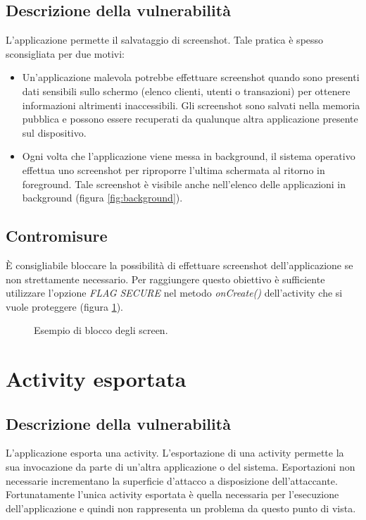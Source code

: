 \subsection{Descrizione della vulnerabilità}
L'applicazione permette il salvataggio di screenshot. Tale pratica è spesso sconsigliata per due motivi:
\begin{itemize}
	\item Un'applicazione malevola potrebbe effettuare screenshot quando sono presenti dati sensibili sullo schermo (elenco clienti, utenti o transazioni) per ottenere informazioni altrimenti inaccessibili. Gli screenshot sono salvati nella memoria pubblica e possono essere recuperati da qualunque altra applicazione presente sul dispositivo.
	\item Ogni volta che l'applicazione viene messa in background, il sistema operativo effettua uno screenshot per riproporre l'ultima schermata al ritorno in foreground. Tale screenshot è visibile anche nell'elenco delle applicazioni in background (figura \ref{fig:background}).
\end{itemize}

\subsection{Contromisure}
È consigliabile bloccare la possibilità di effettuare screenshot dell'applicazione se non strettamente necessario. Per raggiungere questo obiettivo è sufficiente utilizzare l'opzione \emph{FLAG SECURE} nel metodo \emph{onCreate()} dell'activity che si vuole proteggere (figura \ref{fig:screen}).

\begin{figure}[h]
	\centering 
	\caption{Esempio di blocco degli screen.}
	\label{fig:screen}
\end{figure}

\section{Activity esportata}

\subsection{Descrizione della vulnerabilità}
L'applicazione esporta una activity. L'esportazione di una activity permette la sua invocazione da parte di un'altra applicazione o del sistema. Esportazioni non necessarie incrementano la superficie d'attacco a disposizione dell'attaccante. Fortunatamente l'unica activity esportata è quella necessaria per l'esecuzione dell'applicazione e quindi non rappresenta un problema da questo punto di vista. 

